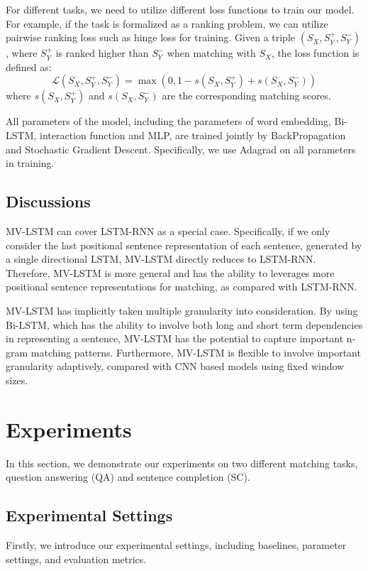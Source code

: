\documentclass[letterpaper]{article}
\begin{document}
For different tasks, we need to utilize different loss functions to train our model.
For example, if the task is formalized as a ranking problem, we can utilize pairwise ranking loss such as hinge loss for training. Given a triple $(S_X,S_Y^+,S_Y^-)$, where $S_Y^+$ is ranked higher than $S_Y^-$ when matching with $S_X$, the loss function is defined as:
\begin{equation*}
\mathcal{L}(S_X, S^+_Y, S^-_Y) = \max(0, 1-s(S_X, S_Y^+)+s(S_X, S_Y^-))
\end{equation*}
where $s(S_X,S_Y^+)$ and $s(S_X,S_Y^-)$ are the corresponding matching scores.

All parameters of the model, including the parameters of word embedding, Bi-LSTM, interaction function and MLP, are trained jointly by BackPropagation and Stochastic Gradient Descent. Specifically, we use Adagrad \cite{duchi2011adaptive} on all parameters in training.

\subsection{Discussions}

MV-LSTM can cover LSTM-RNN \cite{palangi2015deep} as a special case. Specifically, if we only consider the last positional sentence representation of each sentence, generated by a single directional LSTM, MV-LSTM directly reduces to LSTM-RNN. Therefore, MV-LSTM is more general and has the ability to leverages more positional sentence representations for matching, as compared with LSTM-RNN.

MV-LSTM has implicitly taken multiple granularity into consideration. By using Bi-LSTM, which has the ability to involve both long and short term dependencies in representing a sentence, MV-LSTM has the potential to capture important n-gram matching patterns. Furthermore, MV-LSTM is flexible to involve important granularity adaptively, compared with CNN based models using fixed window sizes.

\section{Experiments}
In this section, we demonstrate our experiments on two different matching tasks, question answering (QA) and sentence completion (SC).
\subsection{Experimental Settings}
Firstly, we introduce our experimental settings, including baselines, parameter settings, and evaluation metrics.
\end{document}
